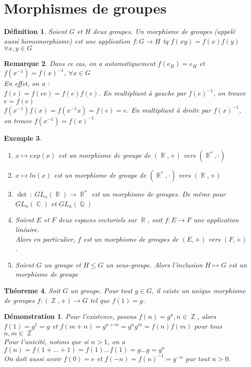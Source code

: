 \documentclass[a4paper, oneside]{report}
\theoremstyle{break}
\newtheorem{thm}{Théoreme}[section] %
\newtheorem{defi}[thm]{Définition}
\newtheorem{exem}[thm]{Exemple}
\newtheorem{remar}[thm]{Remarque}
\newtheorem*{demo}{Démonstration}
\newcommand{\mdg}{morphisme de groupes }
\DeclareMathOperator{\R}{\mathbb{R}}
\DeclareMathOperator{\C}{\mathbb{C}}
\DeclareMathOperator{\Z}{\mathbb{Z}}
\DeclareMathOperator{\Q}{\mathbb{Q}}
\begin{document}
\section{Morphismes de groupes}

\begin{defi}
	Soient $G$ et $H$ deux groupes. Un morphisme de groupes (appelé aussi homomorphisme) est une application $f:G\rightarrow H$ tq $f(xy)=f(x)f(y)$ $\forall x,y\in G$	
\end{defi}

\begin{remar}
	Dans ce cas, on a automatiquement $f(e_H)=e_H$ et $f(x^{-1})= f(x)^{-1},~\forall x\in G$\\
	En effet, on a :\\
	$f(e)=f(ee)=f(e)f(e)$. En multipliant à gauche par $f(e)^{-1}$, on trouve $e=f(e)$\\
	$f(x^{-1})f(x)=f(x^{-1}x)=f(e)=e$. En multipliant à droite par $f(x)^{-1}$, on trouve $f(x^{-1})=f(x)^{-1}$
\end{remar}

\begin{exem}
	\begin{enumerate}
		\item $x\mapsto exp(x)$ est un morphisme de groupe de $(\R,+)$ vers $(\R^*, \cdot)$
		\item $x\mapsto ln(x)$ est un morphisme de groupe de $(\R^*, \cdot)$ vers $(\R,+)$
		\item $\det~:~GL_n(\R)\rightarrow \R^*$ est un morphisme de groupes. De même pour $GL_n(\C)$ et $GL_n(\Q)$
		\item Soient $E$ et $F$ deux espaces vectoriels sur $\R$, soit $f:E\rightarrow F$ une application linéaire.\\
		Alors en particulier, $f$ est un morphisme de groupes de $(E,+)$ vers $(F,+)$.
		\item Soient $G$ un groupe et $H\leq G$ un sous-groupe. Alors l'inclusion $H\mapsto G$ est un morphisme de groupe
	\end{enumerate}
\end{exem}

\begin{thm}
	Soit $G$ un groupe. Pour tout $g\in G$, il existe un unique \mdg $f:(\Z,+)\rightarrow G$ tel que $f(1)=g$.
\end{thm}

\begin{demo}
	Pour l'existence, posons $f(n)=g^n, n\in \Z$, alors $f(1)=g^1=g$ et $f(m+n)=g^{n+m}=g^ng^m=f(n)f(m)$ pour tous $n,m\in \Z$\\
	Pour l'unicité, notons que si $n>1$, on a $f(n)= f(1+...+1)=f(1)...f(1)=g...g=g^n$\\
	On doit aussi avoir $f(0)=e$ et $f(-n)=f(n)^{-1}=g^{-n}$ pur tout $n>0$.	
\end{demo}
\end{document}
